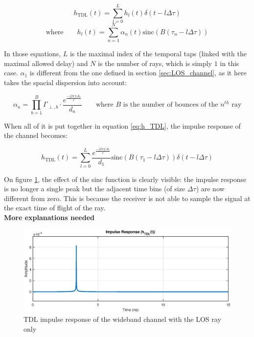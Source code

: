 \documentclass[10pt,a4paper]{ULBreport}
\begin{document}
\begin{equation}
    h_{\text{TDL}}(t) = \sum_{l=0}^{L} h_l(t) \delta(t - l\Delta\tau)
    \label{eq:h_TDL}
\end{equation}
\begin{equation*}
    \text{where} \qquad h_l(t) = \sum_{n=1}^{N} \alpha_n(t) \text{sinc}\left(B(\tau_n - l\Delta\tau)\right)
\end{equation*}

In those equations, $L$ is the maximal index of the temporal taps (linked with the maximal allowed delay) and $N$ is the number of rays, which is simply $1$ in this case. $\alpha_1$ is different from the one defined in section \ref{sec:LOS_channel}, as it here takes the spacial dispersion into account:

\begin{equation*}
    \alpha_n = \prod_{b=1}^{B} \Gamma_{\perp, b} \cdot \frac{e^{\frac{-j2\pi f_c d_n}{c}}}{d_n} \qquad \text{where } B \text{ is the number of bounces of the } n^{th} \text{ ray}
\end{equation*}

When all of it is put together in equation \ref{eq:h_TDL}, the impulse response of the channel becomes:

\begin{equation*}
    h_{\text{TDL}}(t) = \sum_{l=0}^{L}\frac{e^{\frac{-j2\pi f_c d_1}{c}}}{d_1} \text{sinc}\left(B(\tau_1 - l\Delta\tau)\right) \delta(t - l\Delta\tau)
\end{equation*}

On figure \ref{fig:h_TDL_LOS}, the effect of the sinc function is clearly visible: the impulse response is no longer a single peak but the adjacent time bins (of size $\Delta\tau$) are now different from zero. This is because the receiver is not able to sample the signal at the exact time of flight of the ray. \\

\vspace{0.5cm}
\Large \textbf{More explanations needed}
\normalsize\\

\begin{figure}[H]
    \centering
    \includegraphics[width=1\textwidth]{4_2.eps}
    \caption{TDL impulse response of the wideband channel with the LOS ray only}
    \label{fig:h_TDL_LOS}
\end{figure}
\end{document}
